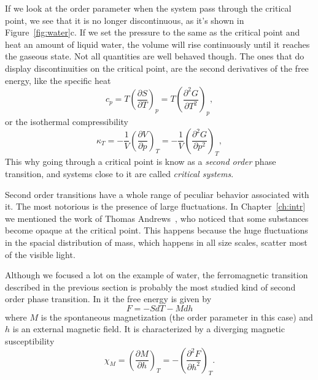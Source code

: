 If we look at the order parameter when the system pass through the critical
point, we see that it is no longer discontinuous, as it's shown in
Figure~\ref{fig:water}c. If we set the pressure to the same as the critical
point and heat an amount of liquid water, the volume will rise continuously
until it reaches the gaseous state. Not all quantities are well behaved though.
The ones that do display discontinuities on the critical point, are the second
derivatives of the free energy, like the specific heat
\begin{equation}
    c_p=T{\left(\frac{\partial S}{\partial T}\right)}_{p}=
    T{\left(\frac{\partial^{2}G}{\partial T^{2}}\right)}_{p},
\end{equation}
or the isothermal compressibility
\begin{equation}
    \kappa_T=-\frac{1}{V}{\left(\frac{\partial V}{\partial p}\right)}_{T}=
    -\frac{1}{V}{\left(\frac{\partial^{2}G}{\partial p^{2}}\right)}_{T},
\end{equation}
This why going through a critical point is know as a \textit{second order}
phase transition, and systems close to it are called \textit{critical systems}.

Second order transitions have a whole range of peculiar behavior associated
with it. The most notorious is the presence of large fluctuations. In
Chapter~\ref{ch:intr} we mentioned the work of Thomas
Andrews~\cite{Andrews1869}, who noticed that some substances become opaque at
the critical point. This happens because the huge fluctuations in the
spacial distribution of mass, which happens in all size scales, scatter most
of the visible light.

Although we focused a lot on the example of water, the ferromagnetic transition
described in the previous section is probably the most studied kind of second
order phase transition. In it the free energy is given by
\begin{equation}
    F = -SdT-Mdh
\end{equation}
where $M$ is the spontaneous magnetization (the order parameter in this case)
and $h$ is an external magnetic field. It is characterized by a diverging
magnetic susceptibility
\begin{equation}
    \chi_{M}=
    {\left(\frac{\partial M}{\partial h}\right)}_{T}=
    -{\left(\frac{\partial^{2}F}{\partial h^{2}}\right)}_{T}.
\end{equation}

